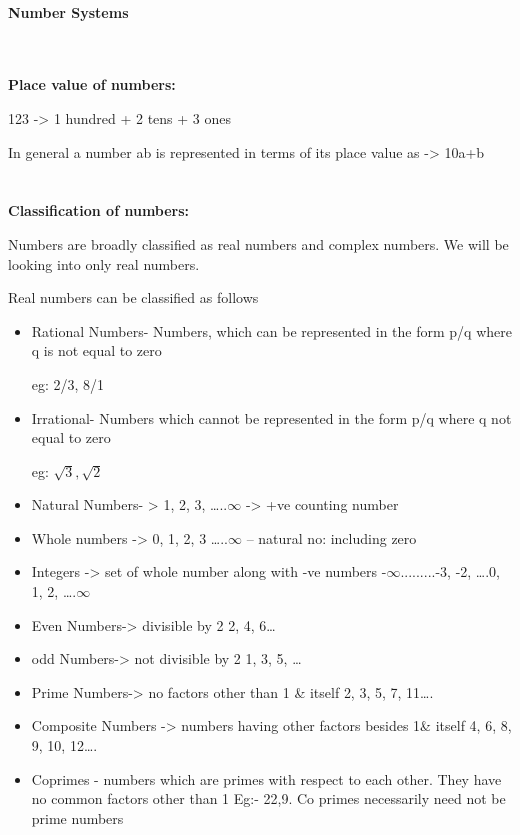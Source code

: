\documentclass[
]{article}
\author{}
\date{}
\begin{document}
\begin{center}
	{\Large \textbf{\\ Number Systems}}
\end{center}

\textbf{\\ \\ Place value of numbers:}

123 -\textgreater{} 1 hundred + 2 tens + 3 ones

In general a number ab is represented in terms of its place value as
-\textgreater{} 10a+b
\\
\textbf{\\ \\ Classification of numbers:}


Numbers are broadly classified as real numbers and complex numbers. We
will be looking into only real numbers.

Real numbers can be classified as follows

\begin{itemize}
	\item Rational Numbers- Numbers, which can be represented in the form p/q
	where q is not equal to zero
	
	eg: 2/3, 8/1
	
	\item Irrational- Numbers which cannot be represented in the form p/q where q not equal to zero 
	
	eg: $ \sqrt{3}, \sqrt{2} $
	
	\item Natural Numbers- > {1, 2, 3, …..$ \infty $} -> +ve counting number
	
	\item Whole numbers -> {0, 1, 2, 3 …..$ \infty $} – natural no: including zero
	
	\item Integers -> set of whole number along with -ve numbers {-$ \infty $.........-3, -2, ….0, 1, 2, ….$ \infty $}
	
	\item Even Numbers-> divisible by 2 {2, 4, 6…}
	
	\item odd Numbers-> not divisible by 2 {1, 3, 5, …}
	
	\item Prime Numbers-> no factors other than 1 \& itself {2, 3, 5, 7, 11….}
	
	\item Composite Numbers -> numbers having other factors besides 1\& itself {4, 6, 8, 9, 10, 
		12….}
	
	\item Coprimes - numbers which are primes with respect to each other. They have no common 
	factors other than 1
	Eg:- 22,9. Co primes necessarily need not be prime numbers
	
\end{itemize}
\end{document}
